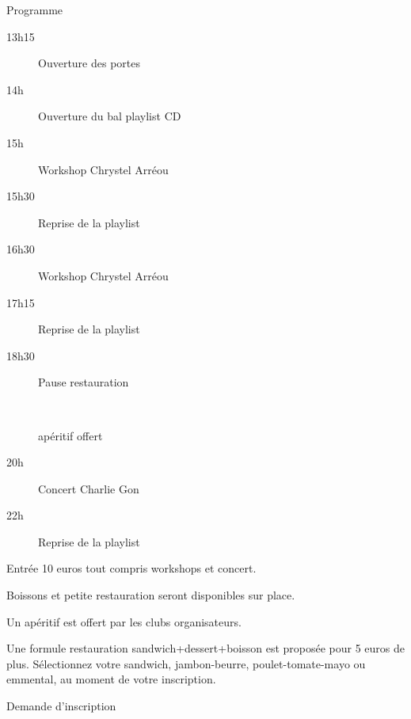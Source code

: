 \documentclass[12pt,a4paper]{article}
\begin{document}
\vfill
\hrulefill
\vfill
\begin{center}
{\Large Programme}\\
\bigskip
\begin{minipage}{0.45\linewidth}
  \begin{description}
\item[13h15] Ouverture des portes
\item[14h~~~] Ouverture du bal playlist CD
\item[15h~~~] Workshop Chrystel Arréou %
\item[15h30] Reprise de la playlist
\item[16h30] Workshop Chrystel Arréou %
\end{description}
\end{minipage}
\hfill
\begin{minipage}{0.45\linewidth}
  \begin{description}
\item[17h15] Reprise de la playlist
\item[18h30] Pause restauration
\item[~~~~~~~~] apéritif offert
\item[20h~~~] Concert Charlie Gon
\item[22h~~~] Reprise de la playlist
\end{description}
\end{minipage}
\end{center}

\vfill
\hrulefill
\vfill

Entrée 10 euros tout compris workshops et concert.

Boissons et petite restauration seront disponibles sur place.

Un apéritif est offert par les clubs organisateurs.

Une formule restauration sandwich+dessert+boisson est proposée pour 5
euros de plus. Sélectionnez votre sandwich, jambon-beurre,
poulet-tomate-mayo ou emmental, au moment de votre inscription.

\vfill
\hrulefill
\hrulefill
\vfill

\begin{center}
\Large Demande d'inscription
\end{center}
\end{document}
